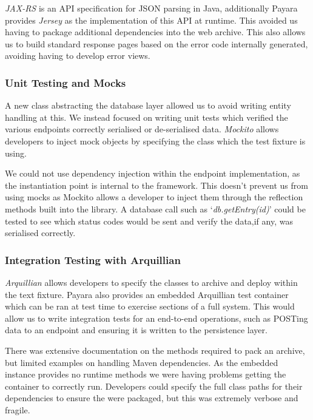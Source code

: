         \par
        \textit{JAX-RS} is an API specification for JSON parsing in Java, additionally Payara provides \textit{Jersey} as the implementation of this API at runtime. This avoided us having to package additional dependencies into the web archive. This also allows us to build standard response pages based on the error code internally generated, avoiding having to develop error views.        

        \subsubsection{Unit Testing and Mocks}
        \par
        A new class abstracting the database layer allowed us to avoid writing entity handling at this. We instead focused on writing unit tests which verified the various endpoints correctly serialised or de-serialised data. \textit{Mockito}\cite{Mockito} allows developers to inject mock objects by specifying the class which the test fixture is using.

        \par
        We could not use dependency injection within the endpoint implementation, as the instantiation point is internal to the framework. This doesn't prevent us from using mocks as Mockito allows a developer to inject them through the reflection methods built into the library. A database call such as `\textit{db.getEntry(id)}' could be tested to see which status codes would be sent and verify the data,if any, was serialised correctly.

        \subsubsection{Integration Testing with Arquillian}
        \textit{Arquillian}\cite{Arquillian} allows developers to specify the classes to archive and deploy within the text fixture. Payara also provides an embedded Arquillian test container which can be ran at test time to exercise sections of a full system. This would allow us to write integration tests for an end-to-end operations, such as POSTing data to an endpoint and ensuring it is written to the persistence layer.

        \par
        There was extensive documentation on the methods required to pack an archive, but limited examples on handling Maven dependencies. As the embedded instance provides no runtime methods we were having problems getting the container to correctly run. Developers could specify the full class paths for their dependencies to ensure the were packaged, but this was extremely verbose and fragile.

